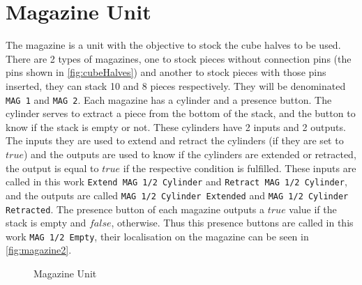 \section{Magazine Unit}
\label{sec:magazine}
The magazine is a unit with the objective to stock the cube halves to be used.
There are 2 types of magazines, one to stock pieces without connection pins (the pins shown in \autoref{fig:cubeHalves}) and another to
 stock pieces with those pins inserted, they can stack 10 and 8 pieces
 respectively. They will be denominated \verb| MAG 1| and \verb|MAG 2|.
Each magazine has a cylinder and a presence button. The cylinder serves to extract a
piece from the bottom of the stack, and the button to know if the stack is empty
or not. These cylinders have 2 inputs and 2
outputs. The inputs they are used to extend and retract the cylinders (if they
are set to $true$) and the
outputs are used to know if the cylinders are extended or retracted, the output
is equal to $true$ if the respective condition is fulfilled. These
inputs  are called in this work \verb|Extend MAG 1/2 Cylinder| and
\verb|Retract MAG 1/2 Cylinder|, and the outputs are called \verb|MAG 1/2 Cylinder Extended| and
\verb|MAG 1/2 Cylinder Retracted|. The presence button of each magazine outputs a $true$
value if the stack is empty and $false$, otherwise. Thus this presence buttons
are called in this work \verb|MAG 1/2 Empty|, their localisation on the magazine
can be seen in \autoref{fig:magazine2}. 
\begin{figure}[H]
  \centering
  \caption{Magazine Unit}
  \label{fig:magazine2}
\end{figure}

